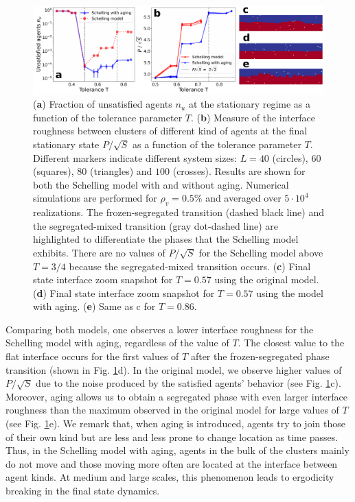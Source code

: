 \begin{figure}
\centering \captionsetup{font=sf}
\includegraphics[width=\linewidth]{Figs/Aging_Schelling/fig7.pdf} 
\caption[Fraction of unsatisfied agents and roughness]{ (\textbf{a}) Fraction of unsatisfied agents $n_u$ at the stationary regime as a function of the tolerance parameter $T$. (\textbf{b}) Measure of the interface roughness between clusters of different kind of agents at the final stationary state $P/\sqrt{S}$ as a function of the tolerance parameter $T$. Different markers indicate different system sizes: $L = 40$ (circles), $60$ (squares), $80$ (triangles) and $100$ (crosses). Results are shown for both the Schelling model with and without aging. Numerical simulations are performed for $\rho_v = 0.5\%$ and averaged over $5 \cdot 10^4$ realizations. The frozen-segregated transition (dashed black line) and the segregated-mixed transition (gray dot-dashed line) are highlighted to differentiate the phases that the Schelling model exhibits. There are no values of $P/\sqrt{S}$ for the Schelling model above $T = 3/4$ because the segregated-mixed transition occurs. (\textbf{c}) Final state interface zoom snapshot for $T = 0.57$ using the original model. (\textbf{d}) Final state interface zoom snapshot for $T = 0.57$ using the model with aging.  (\textbf{e}) Same as c for $T = 0.86$.}
\label{Fig2}
\end{figure}

Comparing both models, one observes a lower interface roughness for the Schelling model with aging, regardless of the value of $T$. The closest value to the flat interface occurs for the first values of $T$ after the frozen-segregated phase transition (shown in Fig. \ref{Fig2}d). In the original model, we observe higher values of $P/\sqrt{S}$ due to the noise produced by the satisfied agents' behavior (see Fig. \ref{Fig2}c). Moreover, aging allows us to obtain a segregated phase with even larger interface roughness than the maximum observed in the original model for large values of $T$ (see Fig. \ref{Fig2}e). We remark that, when aging is introduced, agents try to join those of their own kind but are less and less prone to change location as time passes. Thus, in the Schelling model with aging, agents in the bulk of the clusters mainly do not move and those moving more often are located at the interface between agent kinds. At medium and large scales, this phenomenon leads to ergodicity breaking in the final state dynamics.

